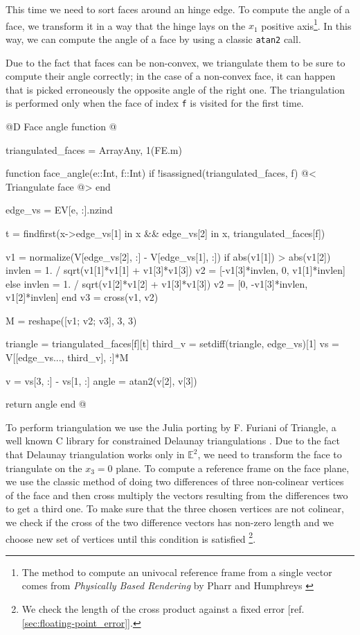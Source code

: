 This time we need to sort faces around an hinge edge.
To compute the angle of a face, we transform it
in a way that the hinge lays on the $x_1$ positive
axis\footnote{The method to compute an univocal reference frame 
from a single vector comes from \textit{Physically Based Rendering} by
Pharr and Humphreys \cite{Pharr:2010:PBR:1854996}}. In this way, 
we can compute the angle of a face
by using a classic \texttt{atan2} call. 

Due to the fact that faces can be non-convex, 
we triangulate them to be sure to compute their 
angle correctly; in the case of a non-convex face, 
it can happen that is picked erroneously the opposite
angle of the right one. The triangulation is performed
only when the face of index \texttt{f} is visited for the first time.


@D Face angle function
@{triangulated_faces = Array{Any, 1}(FE.m)

function face_angle(e::Int, f::Int)
    if !isassigned(triangulated_faces, f)
        @< Triangulate face @>
    end

    edge_vs = EV[e, :].nzind

    t = findfirst(x->edge_vs[1] in x && edge_vs[2] in x, triangulated_faces[f])
    
    v1 = normalize(V[edge_vs[2], :] - V[edge_vs[1], :])
    if abs(v1[1]) > abs(v1[2])
        invlen = 1. / sqrt(v1[1]*v1[1] + v1[3]*v1[3])
        v2 = [-v1[3]*invlen, 0, v1[1]*invlen]
    else
        invlen = 1. / sqrt(v1[2]*v1[2] + v1[3]*v1[3])
        v2 = [0, -v1[3]*invlen, v1[2]*invlen]
    end
    v3 = cross(v1, v2)

    M = reshape([v1; v2; v3], 3, 3)

    triangle = triangulated_faces[f][t]
    third_v = setdiff(triangle, edge_vs)[1]
    vs = V[[edge_vs..., third_v], :]*M

    v = vs[3, :] - vs[1, :]
    angle = atan2(v[2], v[3]) 

    return angle
end
@}

To perform triangulation we use the
Julia porting by F. Furiani of Triangle, 
a well known C library for constrained 
Delaunay triangulations \cite{Triangle.jl}\cite{Triangle}.
Due to the fact that Delaunay triangulation works only
in $\mathbb{E}^2$, we need to transform the face to triangulate
on the $x_3=0$ plane. To compute a reference frame on the
face plane, we use the classic method of doing two differences 
of three non-colinear vertices of the face
and then cross multiply the vectors resulting from the differences
two to get a third one.
To make sure that the three chosen vertices are not colinear, we
check if the cross of the two difference vectors has non-zero length
and we choose new set of vertices until this condition is satisfied%
\footnote{We check the length of the cross product against a fixed
error [ref. \ref{sec:floating-point_error}].}.

